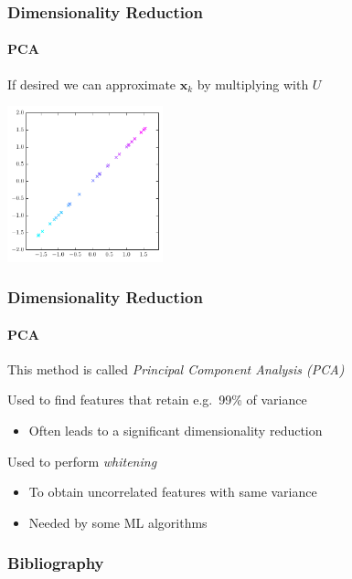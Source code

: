 \documentclass[xetex,professionalfont]{beamer}
\renewcommand{\vec}[1]{\ensuremath{\mathbf{#1}}}
\newcommand{\vx}{\vec{x}}
\begin{document}

\begin{frame}
\frametitle{Dimensionality Reduction}
\framesubtitle{PCA}

If desired we can approximate $\vx_k$ by multiplying with $U$  %

\begin{center}
\includegraphics[width=4.5cm]{figures/pca-reconstructed.pdf}
\end{center}

\end{frame}


\begin{frame}
\frametitle{Dimensionality Reduction}
\framesubtitle{PCA}

This method is called \emph{Principal Component Analysis (PCA)}

\bigskip
Used to find features that retain e.g.\ 99\% of variance
\begin{itemize}
    \item Often leads to a significant dimensionality reduction
\end{itemize}

\bigskip
Used to perform \emph{whitening} %
\begin{itemize}
    \item To obtain uncorrelated features with same variance %
    \item Needed by some ML algorithms
\end{itemize}

\end{frame}


\begin{frame}
\frametitle{Bibliography}

\printbibliography

\end{frame}
\end{document}
